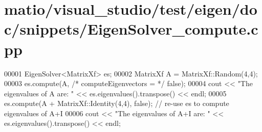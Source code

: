 \hypertarget{matio_2visual__studio_2test_2eigen_2doc_2snippets_2_eigen_solver__compute_8cpp_source}{}\section{matio/visual\+\_\+studio/test/eigen/doc/snippets/\+Eigen\+Solver\+\_\+compute.cpp}
\label{matio_2visual__studio_2test_2eigen_2doc_2snippets_2_eigen_solver__compute_8cpp_source}

\begin{DoxyCode}
00001 EigenSolver<MatrixXf> es;
00002 MatrixXf A = MatrixXf::Random(4,4);
00003 es.compute(A, \textcolor{comment}{/* computeEigenvectors = */} \textcolor{keyword}{false});
00004 cout << \textcolor{stringliteral}{"The eigenvalues of A are: "} << es.eigenvalues().transpose() << endl;
00005 es.compute(A + MatrixXf::Identity(4,4), \textcolor{keyword}{false}); \textcolor{comment}{// re-use es to compute eigenvalues of A+I}
00006 cout << \textcolor{stringliteral}{"The eigenvalues of A+I are: "} << es.eigenvalues().transpose() << endl;
\end{DoxyCode}
